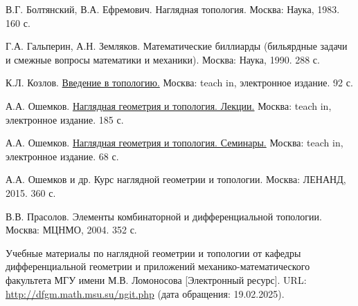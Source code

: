 \begin{thebibliography}{2}
    В.Г. Болтянский, В.А. Ефремович. Наглядная топология. Москва: Наука, 1983. 160 с.

    Г.А. Гальперин, А.Н. Земляков. Математические биллиарды (бильярдные задачи и смежные вопросы математики и механики). Москва: Наука, 1990. 288 с.

    К.Л. Козлов. \href{https://teach-in.ru/file/synopsis/pdf/introduction-to-topology-kozlov-M.pdf}{Введение в топологию.} Москва: teach in, электронное издание. 92 с.

    А.А. Ошемков. \href{https://teach-in.ru/file/synopsis/pdf/visual-geometry-and-topology-oshemkov-M.pdf}{Наглядная геометрия и топология. Лекции.} Москва: teach in, электронное издание. 185 с.
    
    А.А. Ошемков. \href{https://teach-in.ru/file/synopsis/pdf/visual-geometry-and-topology-seminars-oshemkov-M1.pdf}{Наглядная геометрия и топология. Семинары.} Москва: teach in, электронное издание. 68 с.

    А.А. Ошемков и др. Курс наглядной геометрии и топологии. Москва: ЛЕНАНД, 2015. 360 с.

    В.В. Прасолов. Элементы комбинаторной и дифференциальной топологии. Москва: МЦНМО, 2004. 352 с.

    Учебные материалы по наглядной геометрии и топологии от кафедры дифференциальной геометрии и приложений механико-математического факультета МГУ имени М.В. Ломоносова [Электронный ресурс]. URL: \href{http://dfgm.math.msu.su/ngit.php}{http://dfgm.math.msu.su/ngit.php} (дата обращения: 19.02.2025).

\end{thebibliography}